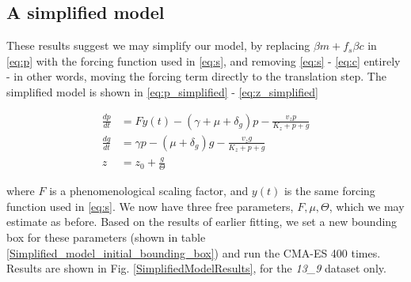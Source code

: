 \documentclass[10pt,journal]{./IEEE_latex_class/IEEEtran}
\begin{document}
\subsection{A simplified model}

These results suggest we may simplify our model, by replacing $\beta m +f_{s}\beta c$ in \eqref{eq:p} with the forcing function used in \eqref{eq:s}, and removing \eqref{eq:s} - \eqref{eq:c} entirely - in other words, moving the forcing term directly to the translation step. The simplified model is shown in \eqref{eq:p_simplified} - \eqref{eq:z_simplified}

\begin{align}
\frac{dp}{dt} & = Fy(t)-(\gamma + \mu + \delta_{g})p - \frac{v_{z}p}{K_{z}+p+g}  \label{eq:p_simplified} \\
\frac{dg}{dt} & = \gamma p - (\mu + \delta_{g})g - \frac{v_{z}g}{K_{z}+p+g} \label{eq:g_simplified} \\
z &= z_{0} +\frac{g}{\Theta} \label{eq:z_simplified}
\end{align}

where $F$ is a phenomenological scaling factor, and $y(t)$ is the same forcing function used in \eqref{eq:s}. We now have three free parameters, $F, \mu, \Theta$, which we may estimate as before. Based on the results of earlier fitting, we set a new bounding box for these parameters (shown in table \ref{Simplified_model_initial_bounding_box}) and run the CMA-ES 400 times.  Results are shown in Fig. \ref{SimplifiedModelResults}, for the \textit{13\_9} dataset only.
\end{document}
